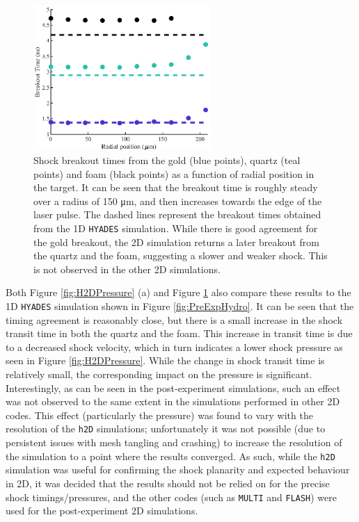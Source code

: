 \begin{figure}[hbt!]
\centering
\includegraphics[width=0.6\textwidth]{figures/Experiment/H2DTiming.eps}%
\caption{\label{fig:H2DTiming} Shock breakout times from the gold (blue points), quartz (teal points) and foam (black points) as a function of radial position in the target. It can be seen that the breakout time is roughly steady over a radius of 150 \unit{\micro\meter}, and then increases towards the edge of the laser pulse. The dashed lines represent the breakout times obtained from the 1D \texttt{HYADES} simulation. While there is good agreement for the gold breakout, the 2D simulation returns a later breakout from the quartz and the foam, suggesting a slower and weaker shock. This is not observed in the other 2D simulations.  }
\end{figure}

Both Figure \ref{fig:H2DPressure} (a) and Figure \ref{fig:H2DTiming} also compare these results to the 1D \texttt{HYADES} simulation shown in Figure \ref{fig:PreExpHydro}. It can be seen that the timing agreement is reasonably close, but there is a small increase in the shock transit time in both the quartz and the foam. This increase in transit time is due to a decreased shock velocity, which in turn indicates a lower shock pressure as seen in Figure \ref{fig:H2DPressure}. While the change in shock transit time is relatively small, the corresponding impact on the pressure is significant. Interestingly, as can be seen in the post-experiment simulations, such an effect was not observed to the same extent in the simulations performed in other 2D codes. This effect (particularly the pressure) was found to vary with the resolution of the \texttt{h2D} simulations; unfortunately it was not possible (due to persistent issues with mesh tangling and crashing) to increase the resolution of the simulation to a point where the results converged. As such, while the \texttt{h2D} simulation was useful for confirming the shock planarity and expected behaviour in 2D, it was decided that the results should not be relied on for the precise shock timings/pressures, and the other codes (such as \texttt{MULTI} and \texttt{FLASH}) were used for the post-experiment 2D simulations.


